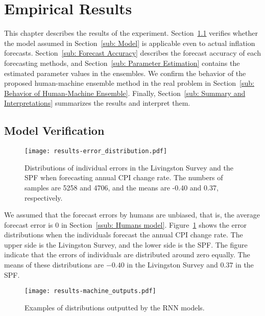 \documentclass[../main.tex]{subfiles}
\begin{document}
\section{Empirical Results}
\label{sec: Empirical Results}

This chapter describes the results of the experiment.
Section~\ref{sub: Model Verification} verifies whether the model assumed in Section~\ref{sub: Model} is applicable even to actual inflation forecasts.
Section~\ref{sub: Forecast Accuracy} describes the forecast accuracy of each forecasting methods, and Section~\ref{sub: Parameter Estimation} contains the estimated parameter values in the ensembles.
We confirm the behavior of the proposed human-machine ensemble method in the real problem in Section~\ref{sub: Behavior of Human-Machine Ensemble}.
Finally, Section~\ref{sub: Summary and Interpretations} summarizes the results and interpret them.

\subsection{Model Verification}
\label{sub: Model Verification}

\begin{figure}
  \centering
  \texttt{[image: results-error\_distribution.pdf]}
  \caption{
    Distributions of individual errors in the Livingston Survey and the SPF when forecasting annual CPI change rate.
    The numbers of samples are 5258 and 4706, and the means are -0.40 and 0.37, respectively.
  }\label{fig: error distribution}
\end{figure}

We assumed that the forecast errors by humans are unbiased, that is, the average forecast error is $0$ in Section~\ref{ssub: Humans model}.
Figure~\ref{fig: error distribution} shows the error distributions when the individuals forecast the annual CPI change rate.
The upper side is the Livingston Survey, and the lower side is the SPF\@.
The figure indicate that the errors of individuals are distributed around zero equally.
The means of these distributions are $-0.40$ in the Livingston Survey and $0.37$ in the SPF\@.

\begin{figure}
  \centering
  \texttt{[image: results-machine\_outputs.pdf]}
  \caption{
    Examples of distributions outputted by the RNN models.
  }\label{fig: machine outputs}
\end{figure}
\end{document}
